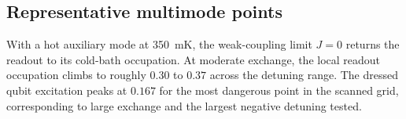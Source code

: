 \documentclass[11pt]{article}
\begin{document}
\subsection{Representative multimode points}
With a hot auxiliary mode at \SI{350}{mK}, the weak-coupling limit \(J=0\) returns the readout to its cold-bath occupation. At moderate exchange, the local readout occupation climbs to roughly \(0.30\) to \(0.37\) across the detuning range. The dressed qubit excitation peaks at \(0.167\) for the most dangerous point in the scanned grid, corresponding to large exchange and the largest negative detuning tested.



\end{document}
